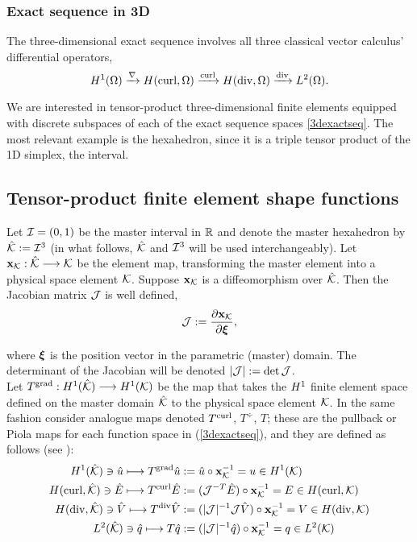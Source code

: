 \subsubsection{Exact sequence in 3D}

The three-dimensional exact sequence involves all three classical vector calculus' differential operators,
% 
\begin{equation}
    H^1(\Omega)\xrightarrow{\nabla}H(\operatorname{curl},\Omega)\xrightarrow{\operatorname{curl}}H(\operatorname{div},\Omega)\xrightarrow{\operatorname{div}}L^2(\Omega).
    \label{3dexactseq}
\end{equation}

We are interested in tensor-product three-dimensional finite elements equipped with discrete subspaces of each of the exact sequence spaces \eqref{3dexactseq}. The most relevant example is the hexahedron, since it is a triple tensor product of the 1D simplex, the interval.

\subsection{Tensor-product finite element shape functions}\label{subsec:tensor_fe}

Let $\mathcal{I}=(0,1)$ be the master interval in $\mathbb{R}$ and denote the master hexahedron by $\hat{\mathcal{K}}:=\mathcal{I}^3$ (in what follows, $\hat{\mathcal{K}}$ and $\mathcal{I}^3$ will be used interchangeably). Let $\mathbf{x}_{\mathcal{K}}:\hat{\mathcal{K}}\longrightarrow\mathcal{K}$ be the element map, transforming the master element into a physical space element $\mathcal{K}$. Suppose $\mathbf{x}_{\mathcal{K}}$ is a diffeomorphism over $\hat{\mathcal{K}}$. Then the Jacobian matrix $\mathcal{J}$ is well defined,
% 
\begin{equation}
    \mathcal{J}:=\frac{\partial\mathbf{x}_{\mathcal{K}}}{\partial\boldsymbol{\xi}},
\end{equation}

\noindent where $\boldsymbol{\xi}$ is the position vector in the parametric (master) domain. The determinant of the Jacobian will be denoted $|\mathcal{J}|:=\det\mathcal{J}$.\\

Let $T^{\operatorname{grad}}:H^1(\hat{\mathcal{K}})\longrightarrow H^1(\mathcal{K})$ be the map that takes the $H^1$ finite element space defined on the master domain $\hat{\mathcal{K}}$ to the physical space element $\mathcal{K}$. In the same fashion consider analogue maps denoted $T^{\operatorname{curl}}$, $T^{\div}$, $T$; these are the pullback or Piola maps for each function space in (\ref{3dexactseq}), and they are defined as follows {\color{blue}(see \cite[\S 2.1.5]{hpbook2})}:
% 
\begin{align}
    H^1(\hat{\mathcal{K}})\ni \hat{u} \longmapsto T^{\operatorname{grad}}\hat{u}&:=\hat{u}\circ\mathbf{x}_{\mathcal{K}}^{-1}=u\in H^1(\mathcal{K})\label{piolah1} \\
    H(\operatorname{curl},\hat{\mathcal{K}})\ni \hat{E} \longmapsto T^{\operatorname{curl}}\hat{E}&:=(\mathcal{J}^{-T}\hat{E})\circ\mathbf{x}_{\mathcal{K}}^{-1}=E\in H(\operatorname{curl},\mathcal{K})\label{piolahcurl} \\
    H(\operatorname{div},\hat{\mathcal{K}})\ni \hat{V} \longmapsto T^{\operatorname{div}}\hat{V}&:=(|\mathcal{J}|^{-1}\mathcal{J}\hat{V})\circ\mathbf{x}_{\mathcal{K}}^{-1}=V\in H(\operatorname{div},\mathcal{K})\label{piolahdiv} \\
    L^2(\hat{\mathcal{K}})\ni \hat{q} \longmapsto T\hat{q}&:=(|\mathcal{J}|^{-1}\hat{q})\circ\mathbf{x}_{\mathcal{K}}^{-1}=q\in L^2(\mathcal{K})\label{piolal2}
\end{align}

